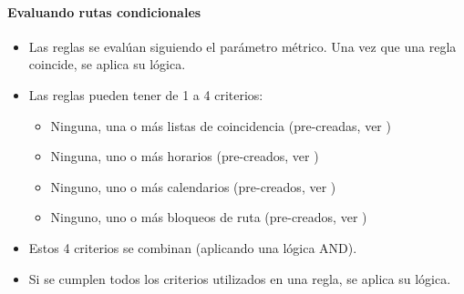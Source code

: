 \documentclass[letterpaper,10pt,spanish]{sphinxmanual}
\begin{document}
\paragraph{Evaluando rutas condicionales}
\label{administration_portal/client/vpbx/routing_endpoints/conditional_routes:evaluating-conditional-routes}\begin{itemize}
\item {} 
Las reglas se evalúan siguiendo el parámetro métrico. Una vez que una regla coincide, se aplica su lógica.

\item {} 
Las reglas pueden tener de 1 a 4 criterios:
\begin{itemize}
\item {} 
Ninguna, una o más listas de coincidencia (pre-creadas, ver {\hyperref[administration_portal/client/vpbx/routing_tools/match_lists:match\string-lists]{}})

\item {} 
Ninguna, uno o más horarios (pre-creados, ver {\hyperref[administration_portal/client/vpbx/routing_tools/schedules:schedules]{}})

\item {} 
Ninguno, uno o más calendarios (pre-creados, ver {\hyperref[administration_portal/client/vpbx/routing_tools/calendars:calendars]{}})

\item {} 
Ninguno, uno o más bloqueos de ruta (pre-creados, ver {\hyperref[administration_portal/client/vpbx/routing_tools/route_locks:id1]{}})

\end{itemize}

\item {} 
Estos 4 criterios se combinan (aplicando una lógica AND).

\item {} 
Si se cumplen todos los criterios utilizados en una regla, se aplica su lógica.

\end{itemize}
\end{document}
